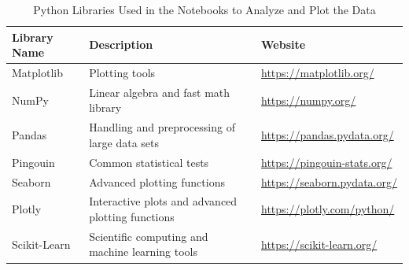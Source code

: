 \begin{table}[htbp]
\centering
\caption{Python Libraries Used in the Notebooks to Analyze and Plot the Data}
\begin{tabular}{|l|p{4.5cm}|p{5cm}|}
\hline
\textbf{Library Name} & \textbf{Description} & \textbf{Website} \\
\hline
Matplotlib & Plotting tools & \url{https://matplotlib.org/} \\
\hline
NumPy & Linear algebra and fast math library & \url{https://numpy.org/} \\
\hline
Pandas & Handling and preprocessing of large data sets & \url{https://pandas.pydata.org/} \\
\hline
Pingouin & Common statistical tests & \url{https://pingouin-stats.org/} \\
\hline
Seaborn & Advanced plotting functions & \url{https://seaborn.pydata.org/} \\
\hline
Plotly & Interactive plots and advanced plotting functions & \url{https://plotly.com/python/} \\
\hline
Scikit-Learn & Scientific computing and machine learning tools & \url{https://scikit-learn.org/} \\
\hline
\end{tabular}
\label{library_table}
\end{table}
